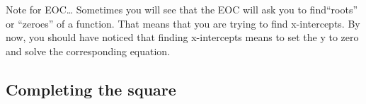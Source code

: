 %
%
%
%
%
%
%
%
%
%
%
%
%


Note for EOC\ldots{} Sometimes you will see that the EOC will ask you to find``roots'' or ``zeroes'' of a function. That means that you are trying to find x-intercepts. By now, you should have noticed that finding x-intercepts means to set the y to zero and solve the corresponding equation.

\subsection{Completing the square}


